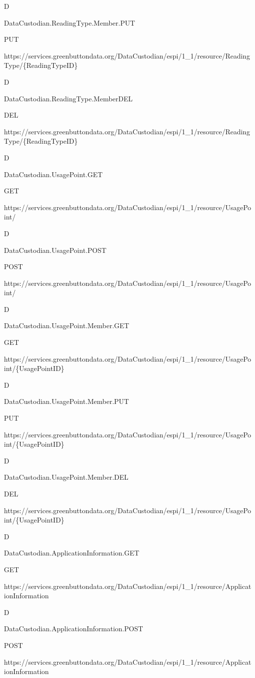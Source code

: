 \documentclass[a4paper,12pt,single,pdftex]{scrbook}
\begin{document}
D

DataCustodian.ReadingType.Member.PUT

PUT

https://services.greenbuttondata.org/DataCustodian/espi/1\_1/resource/ReadingType/\{ReadingTypeID\}

D

DataCustodian.ReadingType.MemberDEL

DEL

https://services.greenbuttondata.org/DataCustodian/espi/1\_1/resource/ReadingType/\{ReadingTypeID\}

D

DataCustodian.UsagePoint.GET

GET

https://services.greenbuttondata.org/DataCustodian/espi/1\_1/resource/UsagePoint/

D

DataCustodian.UsagePoint.POST

POST

https://services.greenbuttondata.org/DataCustodian/espi/1\_1/resource/UsagePoint/

D

DataCustodian.UsagePoint.Member.GET

GET

https://services.greenbuttondata.org/DataCustodian/espi/1\_1/resource/UsagePoint/\{UsagePointID\}

D

DataCustodian.UsagePoint.Member.PUT

PUT

https://services.greenbuttondata.org/DataCustodian/espi/1\_1/resource/UsagePoint/\{UsagePointID\}

D

DataCustodian.UsagePoint.Member.DEL

DEL

https://services.greenbuttondata.org/DataCustodian/espi/1\_1/resource/UsagePoint/\{UsagePointID\}

D

DataCustodian.ApplicationInformation.GET

GET

https://services.greenbuttondata.org/DataCustodian/espi/1\_1/resource/ApplicationInformation

D

DataCustodian.ApplicationInformation.POST

POST

https://services.greenbuttondata.org/DataCustodian/espi/1\_1/resource/ApplicationInformation
\end{document}
